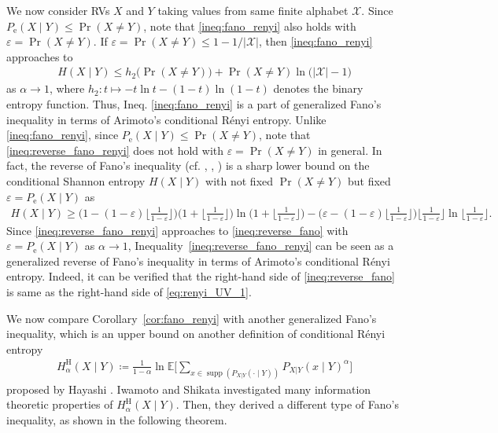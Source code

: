 \documentclass[conference, draftcls, onecolumn]{IEEEtran}
\theoremstyle{plain}
\newcommand{\supp}{\operatorname{supp}}
\newcommand{\corref}[1]{Corollary~\ref{#1}}
\begin{document}
We now consider RVs $X$ and $Y$ taking values from same finite alphabet $\mathcal{X}$.
Since $P_{\mathrm{e}}(X \mid Y) \le \Pr(X \neq Y)$, note that \eqref{ineq:fano_renyi} also holds with $\varepsilon = \Pr(X \neq Y)$.
If $\varepsilon = \Pr(X \neq Y) \le 1 - 1/|\mathcal{X}|$, then \eqref{ineq:fano_renyi} approaches to
\begin{align}
H(X \mid Y)
\le
h_{2} \big( \! \Pr(X \neq Y) \big) + \Pr(X \neq Y) \ln \! \big( |\mathcal{X}| - 1 \big)
\end{align}
as $\alpha \to 1$, where $h_{2} : t \mapsto - t \ln t - (1-t) \ln (1-t)$ denotes the binary entropy function.
Thus, Ineq. \eqref{ineq:fano_renyi} is a part of generalized Fano's inequality in terms of Arimoto's conditional R\'{e}nyi entropy.
Unlike \eqref{ineq:fano_renyi}, since $P_{\mathrm{e}}(X \mid Y) \le \Pr(X \neq Y)$, note that \eqref{ineq:reverse_fano_renyi} does not hold with $\varepsilon = \Pr(X \neq Y)$ in general.
In fact, the reverse of Fano's inequality (cf.  \cite[Theorem~1]{feder}, \cite[Eq.~(15)]{kovalevsky}, \cite[Eq.~(6)]{tebbe}) is a sharp lower bound on the conditional Shannon entropy $H(X \mid Y)$ with not fixed $\Pr( X \neq Y )$ but fixed $\varepsilon = P_{\mathrm{e}}(X \mid Y)$ as
\begin{align}
H(X \mid Y)
\ge
\bigg( 1 - (1 - \varepsilon) \Big\lfloor \frac{ 1 }{ 1 - \varepsilon } \Big\rfloor \bigg) \Big( 1 + \Big\lfloor \frac{ 1 }{ 1 - \varepsilon } \Big\rfloor \Big) \ln \! \Big( 1 + \Big\lfloor \frac{ 1 }{ 1 - \varepsilon } \Big\rfloor \Big) - \bigg( \varepsilon - (1 - \varepsilon) \Big\lfloor \frac{ 1 }{ 1 - \varepsilon } \Big\rfloor \bigg) \Big\lfloor \frac{ 1 }{ 1 - \varepsilon } \Big\rfloor \ln \! \Big\lfloor \frac{ 1 }{ 1 - \varepsilon } \Big\rfloor .
\label{ineq:reverse_fano}
\end{align}
Since \eqref{ineq:reverse_fano_renyi} approaches to \eqref{ineq:reverse_fano} with $\varepsilon = P_{\mathrm{e}}(X \mid Y)$ as $\alpha \to 1$, Inequality~\eqref{ineq:reverse_fano_renyi} can be seen as a generalized reverse of Fano's inequality in terms of Arimoto's conditional R\'{e}nyi entropy.
Indeed, it can be verified that the right-hand side of \eqref{ineq:reverse_fano} is same as the right-hand side of \eqref{eq:renyi_UV_1}.


We now compare \corref{cor:fano_renyi} with another generalized Fano's inequality, which is an upper bound on another definition of conditional R\'{e}nyi entropy
\begin{align}
H_{\alpha}^{\mathrm{H}}(X \mid Y)
\coloneqq
\frac{ 1 }{ 1 - \alpha } \ln \mathbb{E} \bigg[ \sum_{x \in \supp( P_{X|Y}(\cdot \mid Y) )} P_{X|Y}(x \mid Y)^{\alpha} \bigg]
\end{align}
proposed by Hayashi \cite{hayashi}.
Iwamoto and Shikata \cite{iwamoto} investigated many information theoretic properties of $H_{\alpha}^{\mathrm{H}}(X \mid Y)$.
Then, they derived a different type of Fano's inequality, as shown in the following theorem.
\end{document}
